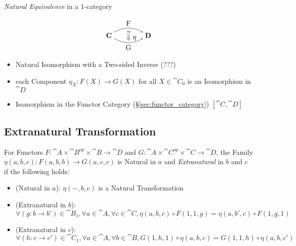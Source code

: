 \emph{Natural Equivalence} in a $1$-category %

\[
  \begin{tikzpicture}
    \node (C) at (-1,0) {$\cat{C}$};
    \node (D) at (1,0) {$\cat{D}$};
    \node (N) at (0,0) {$\;\;\;\stackrel{\simeq}{\Downarrow}\eta$};
    \draw[->,bend left] (C) to node [above] {F} (D);
    \draw[->,bend right] (C) to node [below] {G} (D);
  \end{tikzpicture}
\]

\begin{itemize}
  \item Natural Isomorphism with a Two-sided Inverse (???)
  \item each Component $\eta_X : F(X) \rightarrow G(X)$ for all $X
    \in \cat{C}_0$ is an Isomorphism in $\cat{D}$
  \item Isomorphism in the Functor Category
    (\S\ref{sec:functor_category}) $[\cat{C},\cat{D}]$
\end{itemize}



\subsection{Extranatural Transformation}
\label{sec:extranatural_transformation}

For Functors $F : \cat{A} \times \cat{B}^{op} \times \cat{B}
\rightarrow \cat{D}$ and $G : \cat{A} \times \cat{C}^{op} \times
\cat{C} \rightarrow \cat{D}$, the Family $\eta(a,b,c) : F(a,b,b)
\rightarrow G(a,c,c)$ is Natural in $a$ and \emph{Extranatural} in $b$
and $c$ if the following holds:
\begin{itemize}
  \item (Natural in $a$): $\eta (-,b,c)$ is a Natural Transformation
  \item (Extranatural in $b$): $\forall (g:b \rightarrow b') \in
    \cat{B}_1, \forall a \in \cat{A}, \forall c \in \cat{C},
    \eta(a,b,c) \circ F(1,1,g) = \eta(a,b',c) \circ F(1,g,1)$
  \item (Extranatural in $c$): $\forall (h:c \rightarrow c') \in
    \cat{C}_1, \forall a \in \cat{A}, \forall b \in \cat{B}, G(1,h,1)
    \circ \eta(a,b,c) = G(1,1,h) \circ \eta(a,b,c')$
\end{itemize}




